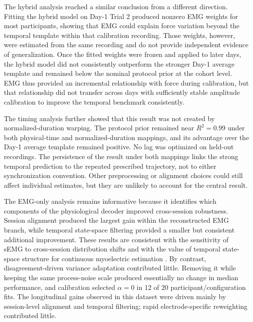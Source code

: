 \documentclass[preprint,12pt]{elsarticle}
\begin{document}
The hybrid analysis reached a similar conclusion from a different direction. Fitting the hybrid model on Day-1 Trial 2 produced nonzero EMG weights for most participants, showing that EMG could explain force variation beyond the temporal template within that calibration recording. Those weights, however, were estimated from the same recording and do not provide independent evidence of generalization. Once the fitted weights were frozen and applied to later days, the hybrid model did not consistently outperform the stronger Day-1 average template and remained below the nominal protocol prior at the cohort level. EMG thus provided an incremental relationship with force during calibration, but that relationship did not transfer across days with sufficiently stable amplitude calibration to improve the temporal benchmark consistently.

The timing analysis further showed that this result was not created by normalized-duration warping. The protocol prior remained near $R^2=0.99$ under both physical-time and normalized-duration mappings, and its advantage over the Day-1 average template remained positive. No lag was optimized on held-out recordings. The persistence of the result under both mappings links the strong temporal prediction to the repeated prescribed trajectory, not to either synchronization convention. Other preprocessing or alignment choices could still affect individual estimates, but they are unlikely to account for the central result.

The EMG-only analysis remains informative because it identifies which components of the physiological decoder improved cross-session robustness. Session alignment produced the largest gain within the reconstructed EMG branch, while temporal state-space filtering provided a smaller but consistent additional improvement. These results are consistent with the sensitivity of sEMG to cross-session distribution shifts \cite{Wang2024,Li2024} and with the value of temporal state-space structure for continuous myoelectric estimation \cite{Dutra2021,Dutra2023,Zhao2025StateSpace}. By contrast, disagreement-driven variance adaptation contributed little. Removing it while keeping the same process-noise scale produced essentially no change in median performance, and calibration selected $\alpha=0$ in 12 of 20 participant/configuration fits. The longitudinal gains observed in this dataset were driven mainly by session-level alignment and temporal filtering; rapid electrode-specific reweighting contributed little.
\end{document}
